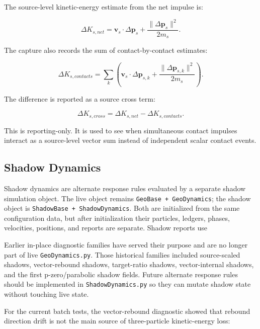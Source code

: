 The source-level kinetic-energy estimate from the net impulse is:

\begin{equation}
\Delta K_{s,net}
=
\mathbf{v}_s \cdot \Delta \mathbf{p}_s
+
\frac{\lVert \Delta \mathbf{p}_s \rVert^2}{2m_s}.
\end{equation}

The capture also records the sum of contact-by-contact estimates:

\begin{equation}
\Delta K_{s,contacts}
=
\sum_k
\left(
\mathbf{v}_s \cdot \Delta \mathbf{p}_{s,k}
+
\frac{\lVert \Delta \mathbf{p}_{s,k} \rVert^2}{2m_s}
\right).
\end{equation}

The difference is reported as a source cross term:

\begin{equation}
\Delta K_{s,cross}
=
\Delta K_{s,net} - \Delta K_{s,contacts}.
\end{equation}

This is reporting-only.  It is used to see when simultaneous contact impulses
interact as a source-level vector sum instead of independent scalar contact
events.

\subsection{Shadow Dynamics}

Shadow dynamics are alternate response rules evaluated by a separate shadow
simulation object.  The live object remains
\texttt{GeoBase + GeoDynamics}; the shadow object is
\texttt{ShadowBase + ShadowDynamics}.  Both are initialized from the same
configuration data, but after initialization their particles, ledgers, phases,
velocities, positions, and reports are separate.  Shadow reports use

Earlier in-place diagnostic families have served their purpose and are no
longer part of live \texttt{GeoDynamics.py}.  Those historical families
included source-scaled shadows, vector-rebound shadows, target-ratio shadows,
vector-internal shadows, and the first p-zero/parabolic shadow fields.  Future
alternate response rules should be implemented in \texttt{ShadowDynamics.py}
so they can mutate shadow state without touching live state.

For the current batch tests, the vector-rebound diagnostic showed that rebound
direction drift is not the main source of three-particle kinetic-energy loss:

